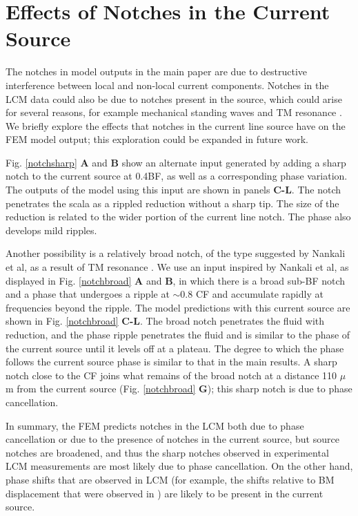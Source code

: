 \documentclass{article}
\begin{document}
\section{ {Effects of Notches in the Current Source}}
\par{The notches in model outputs in the main paper are due to destructive interference between local and non-local current components. Notches in the LCM data could also be due to notches present in the source, which could arise for several reasons, for example mechanical standing waves \cite{coopershera} and TM resonance \cite{nankaliwang}. We briefly explore the effects that notches in the current line source have on the FEM model output; this exploration could be expanded in future work.}
\par{ {Fig. \ref{notchsharp} \textbf{A} and \textbf{B} show an alternate input generated by adding a sharp notch to the current source at 0.4BF, as well as a corresponding phase variation. The outputs of the model using this input are shown in panels \textbf{C-L}. The notch penetrates the scala as a rippled reduction without a sharp tip. The size of the reduction is related to the wider portion of the current line notch. The phase also develops mild ripples.}}
\par{ {Another possibility is a relatively broad notch, of the type suggested by Nankali et al, as a result of TM resonance \cite{nankaliwang}. We use an input inspired by Nankali et al, as displayed in Fig. \ref{notchbroad} \textbf{A} and \textbf{B}, in which there is a broad sub-BF notch and a phase that undergoes a ripple at $\sim$0.8 CF and accumulate rapidly at frequencies beyond the ripple. The model predictions with this current source are shown in Fig. \ref{notchbroad} \textbf{C-L}. The broad notch penetrates the fluid with reduction, and the phase ripple penetrates the fluid and is similar to the phase of the current source until it levels off at a plateau.  The degree to which the phase follows the current source phase is similar to that in the main results. A sharp notch close to the CF joins what remains of the broad notch at a distance 110 $\mu$m from the current source (Fig. \ref{notchbroad} \textbf{G}); this sharp notch is due to phase cancellation.}}
\par{ {In summary, the FEM predicts notches in the LCM both due to phase cancellation or due to the presence of notches in the current source, but source notches are broadened, and thus the sharp notches observed in experimental LCM measurements are most likely due to phase cancellation. On the other hand, phase shifts that are observed in LCM (for example, the shifts relative to BM displacement that were observed in \cite{dongolson}) are likely to be present in the current source.}}
\end{document}

